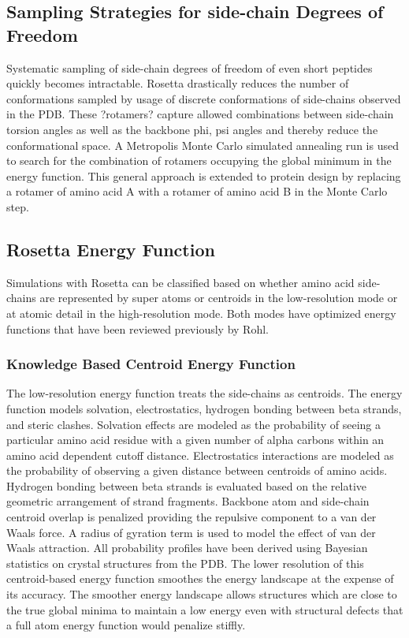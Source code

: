 \subsection{Sampling Strategies for side-chain Degrees of Freedom}
Systematic sampling of side-chain degrees of freedom of even short peptides quickly becomes intractable\citep{Levinthal:1968vd}.
Rosetta drastically reduces the number of conformations sampled by usage of discrete conformations of side-chains observed in the PDB\citep{Kuhlman:2000tc,Dunbrack:1993jt}.
These ?rotamers? capture allowed combinations between side-chain torsion angles as well as the backbone phi, psi angles and thereby reduce the conformational space\citep{Dunbrack:1993jt}.
A Metropolis Monte Carlo simulated annealing run is used to search for the combination of rotamers occupying the global minimum in the energy function\citep{Kuhlman:2000tc,LeaverFay:2005vc}.
This general approach is extended to protein design by replacing a rotamer of amino acid A with a rotamer of amino acid B in the Monte Carlo step.

\subsection{Rosetta Energy Function}
Simulations with Rosetta can be classified based on whether amino acid side-chains are represented by super atoms or centroids in the low-resolution mode or at atomic detail in the high-resolution mode.
Both modes have optimized energy functions that have been reviewed previously by Rohl\citep{Rohl:2004dh}.

\subsubsection{Knowledge Based Centroid Energy Function}
The low-resolution energy function treats the side-chains as centroids\citep{Simons:1997do,Simons:1999wp}.
The energy function models solvation, electrostatics, hydrogen bonding between beta strands, and steric clashes.
Solvation effects are modeled as the probability of seeing a particular amino acid residue with a given number of alpha carbons within an amino acid dependent cutoff distance.
Electrostatics interactions are modeled as the probability of observing a given distance between centroids of amino acids.
Hydrogen bonding between beta strands is evaluated based on the relative geometric arrangement of strand fragments.
Backbone atom and side-chain centroid overlap is penalized providing the repulsive component to a van der Waals force.
A radius of gyration term is used to model the effect of van der Waals attraction.
All probability profiles have been derived using Bayesian statistics on crystal structures from the PDB.
The lower resolution of this centroid-based energy function smoothes the energy landscape at the expense of its accuracy.
The smoother energy landscape allows structures which are close to the true global minima to maintain a low energy even with structural defects that a full atom energy function would penalize stiffly.

